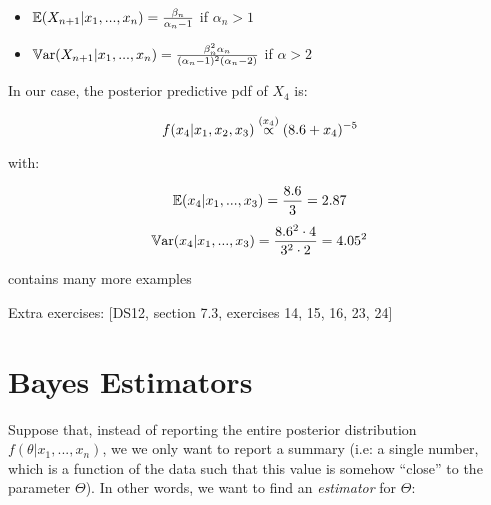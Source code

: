 \documentclass[a4paper]{article}
\begin{document}
                \begin{itemize}
                    \item $\mathbb{E}(X_{n+1} | x_1, ..., x_n) = \frac{\beta_n}{\alpha_n
                        - 1}$ if $\alpha_n > 1$
                    \item $\mathbb{V}\text{ar}(X_{n+1} | x_1, ..., x_n) = \frac{\beta_n^2
                        \alpha_n}{(\alpha_n - 1)^2(\alpha_n - 2)}$ if $\alpha >
                        2$
                \end{itemize}

                In our case, the posterior predictive pdf of $X_4$ is:

                \[
                    f(x_4 | x_1, x_2, x_3) \stackrel{({x_4})}{\propto} (8.6 + x_4)^{-5}
                \]

                with:

                \[
                    \mathbb{E}(x_4 | x_1, ..., x_3) = \frac{8.6}{3} = 2.87
                \]
                \[
                    \mathbb{V}\text{ar}(x_4 | x_1, ..., x_3) = \frac{8.6^2 \cdot 4}{3^2 \cdot 2
                    } = 4.05^2
                \]

                \begin{fread}
                    [DS12, section 7.3] contains many more examples
                \end{fread}

                \begin{relq}

                    Extra exercises: [DS12, section 7.3, exercises 14, 15, 16,
                    23, 24]
                \end{relq}

    \newpage
    \section{Bayes Estimators}
        \begin{fread}
            [DS12, section 7.4]
        \end{fread}

        Suppose that, instead of reporting the entire posterior distribution
        $f(\theta | x_1, ..., x_n)$, we we only want to report a summary (i.e: a
        single number, which is a function of the data such that this value is
        somehow ``close'' to the parameter $\Theta$). In other words, we want to
        find an \textit{estimator} for $\Theta$:
\end{document}

